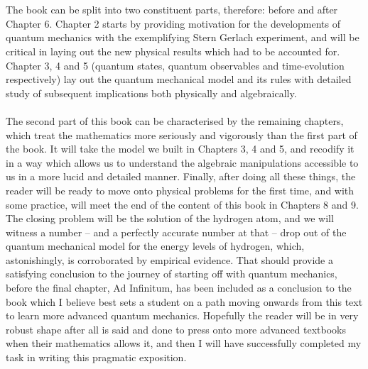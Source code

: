 \\\\
The book can be split into two constituent parts, therefore: before and after Chapter 6. Chapter 2 starts by providing motivation for the developments of quantum mechanics with the exemplifying Stern Gerlach experiment, and will be critical in laying out the new physical results which had to be accounted for. Chapter 3, 4 and 5 (quantum states, quantum observables and time-evolution respectively) lay out the quantum mechanical model and its rules with detailed study of subsequent implications both physically and algebraically. 
\\\\
The second part of this book can be characterised by the remaining chapters, which treat the mathematics more seriously and vigorously than the first part of the book. It will take the model we built in Chapters 3, 4 and 5, and recodify it in a way which allows us to understand the algebraic manipulations accessible to us in a more lucid and detailed manner. Finally, after doing all these things, the reader will be ready to move onto physical problems for the first time, and with some practice, will meet the end of the content of this book in Chapters 8 and 9. The closing problem will be the solution of the hydrogen atom, and we will witness a number -- and a perfectly accurate number at that -- drop out of the quantum mechanical model for the energy levels of hydrogen, which, astonishingly, is corroborated by empirical evidence. That should provide a satisfying conclusion to the journey of starting off with quantum mechanics, before the final chapter, Ad Infinitum, has been included as a conclusion to the book which I believe best sets a student on a path moving onwards from this text to learn more advanced quantum mechanics.  Hopefully the reader will be in very robust shape after all is said and done to press onto more advanced textbooks when their mathematics allows it, and then I will have successfully completed my task in writing this pragmatic exposition.

\tableofcontents
